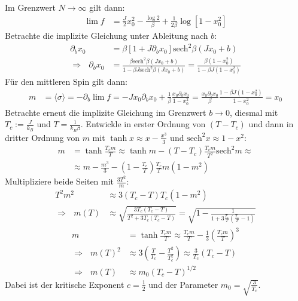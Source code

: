 \documentclass[a4paper,12pt]{article}
\newcommand{\bra}{}
\newcommand{\kla}{}
\newcommand{\klam}{}
\newcommand{\tecxt}{}
\begin{document}
Im Grenzwert $N\rightarrow\infty $ gilt dann:
\begin{align*}
\lim f&=\frac{J}{2}x_0^2-\frac{\log 2}{\beta}+\frac{1}{2\beta}\log\klam\left[ {1-x_0^2} \right]
\end{align*}
Betrachte die implizite Gleichung unter Ableitung nach $b$:
\begin{align*}
\partial_bx_0&=\beta\klam\left[ {1+J\partial_bx_0} \right]\tecxt\text{sech}^2\beta(Jx_0+b)\\
\Rightarrow\ \ \ \partial_bx_0&=\frac{\beta\tecxt\text{sech}^2\beta(Jx_0+b)}{1-\beta J\tecxt\text{sech}^2\beta(Jx_0+b)}=\frac{\beta (1-x_0^2)}{1-\beta J(1-x_0^2)}
\end{align*}
Für den mittleren Spin gilt dann:
\begin{align*}
m&=\bra\langle {\sigma}\rangle=-\partial_b\lim f=-Jx_0\partial_bx_0+\frac{1}{\beta}\frac{x_0\partial_bx_0}{1-x_0^2}=\frac{x_0\partial_bx_0}{\beta}\frac{1-\beta J(1-x_0^2)}{1-x_0^2}=x_0
\end{align*}
Betrachte erneut die implizite Gleichung im Grenzwert $b\rightarrow 0$, diesmal mit $T_c:=\frac{J}{k_B}$ und $T=\frac{1}{k_B\beta}$. Entwickle in erster Ordnung von $(T-T_c)$ und dann in dritter Ordnung von $m$ mit $\tanh x\approx x-\frac{x^3}{3}$ und $\tecxt\text{sech}^2x\approx 1-x^2$:
\begin{align*}
m&=\tanh\frac{T_cm}{T}\approx\tanh m-(T-T_c)\frac{T_cm}{T^2}\tecxt\text{sech}^2m\approx\\
&\approx m-\frac{m^3}{3}-\kla\left( {1-\frac{T_c}{T}} \right)\frac{T_c}{T}m(1-m^2)
\end{align*}
Multipliziere beide Seiten mit $\frac{3T^2}{m}$:
\begin{align*}
T^2m^2&\approx 3\kla\left( {T_c-T} \right)T_c(1-m^2)\\
\Rightarrow\ \ \ m(T)&\approx\sqrt{\frac{3T_c(T_c-T)}{T^2+3T_c(T_c-T)}}=\sqrt{1-\frac{1}{1+3\frac{T_c}{T}\kla\left( {\frac{T_c}{T}-1} \right)}}
\end{align*}
\begin{align*}
m&=\tanh\frac{T_cm}{T}\approx\frac{T_cm}{T}-\frac{1}{3}\kla\left( {\frac{T_cm}{T}} \right)^3\\
\Rightarrow\ \ \ m(T)^2&\approx 3\kla\left( {\frac{T}{T_c}-\frac{T^2}{T_c^2}} \right)\approx \frac{3}{T_c}(T_c-T)\\
\Rightarrow\ \ \ m(T)&\approx m_0\kla\left( {T_c-T} \right)^{1/2}
\end{align*}
Dabei ist der kritische Exponent $c=\frac{1}{2}$ und der Parameter $m_0=\sqrt{\frac{3}{T_c}}$.\newpage
\end{document}
